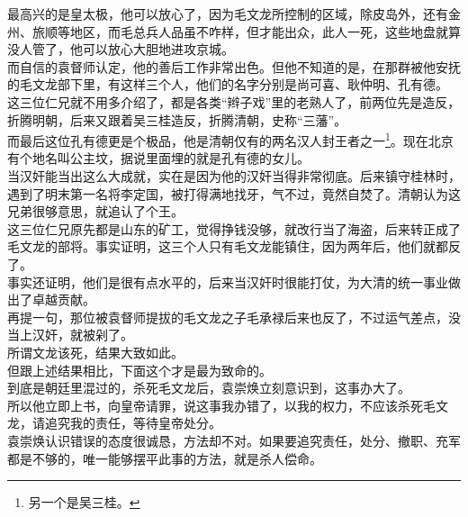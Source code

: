 \begin{multicols}{\theparacolNo}
最高兴的是皇太极，他可以放心了，因为毛文龙所控制的区域，除皮岛外，还有金州、旅顺等地区，而毛总兵人品虽不咋样，但才能出众，此人一死，这些地盘就算没人管了，他可以放心大胆地进攻京城。\\

而自信的袁督师认定，他的善后工作非常出色。但他不知道的是，在那群被他安抚的毛文龙部下里，有这样三个人，他们的名字分别是尚可喜、耿仲明、孔有德。\\

这三位仁兄就不用多介绍了，都是各类“辫子戏”里的老熟人了，前两位先是造反，折腾明朝，后来又跟着吴三桂造反，折腾清朝，史称“三藩”。\\

而最后这位孔有德更是个极品，他是清朝仅有的两名汉人封王者之一\footnote{另一个是吴三桂。}。现在北京有个地名叫公主坟，据说里面埋的就是孔有德的女儿。\\

当汉奸能当出这么大成就，实在是因为他的汉奸当得非常彻底。后来镇守桂林时，遇到了明末第一名将李定国，被打得满地找牙，气不过，竟然自焚了。清朝认为这兄弟很够意思，就追认了个王。\\

这三位仁兄原先都是山东的矿工，觉得挣钱没够，就改行当了海盗，后来转正成了毛文龙的部将。事实证明，这三个人只有毛文龙能镇住，因为两年后，他们就都反了。\\

事实还证明，他们是很有点水平的，后来当汉奸时很能打仗，为大清的统一事业做出了卓越贡献。\\

再提一句，那位被袁督师提拔的毛文龙之子毛承禄后来也反了，不过运气差点，没当上汉奸，就被剁了。\\

所谓文龙该死，结果大致如此。\\

但跟上述结果相比，下面这个才是最为致命的。\\

到底是朝廷里混过的，杀死毛文龙后，袁崇焕立刻意识到，这事办大了。\\

所以他立即上书，向皇帝请罪，说这事我办错了，以我的权力，不应该杀死毛文龙，请追究我的责任，等待皇帝处分。\\

袁崇焕认识错误的态度很诚恳，方法却不对。如果要追究责任，处分、撤职、充军都是不够的，唯一能够摆平此事的方法，就是杀人偿命。\\
\ifnum{}
	\end{multicols}
\fi
\newpage
